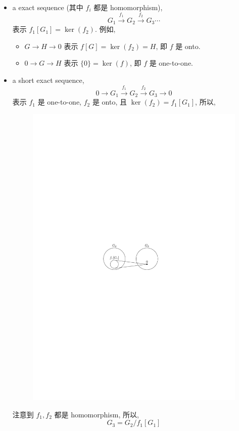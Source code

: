 \begin{itemize}
	\item a exact sequence (其中 $f_i$ 都是 homomorphism),
	\begin{equation}
		G_1 \overset{f_1}{\rightarrow} G_2 \overset{f_2}{\rightarrow} G_3 \cdots
	\end{equation}
	表示 $f_1[G_1] = \ker(f_2)$. 例如,
	\begin{itemize}
		\item $G \rightarrow H \rightarrow 0$ 表示 $f[G] = \ker(f_2) = H$, 即 $f$ 是 onto.
		
		\item $0 \rightarrow G \rightarrow H$ 表示 $\{0\} = \ker(f)$, 即 $f$ 是 one-to-one.
	\end{itemize}
	
	\item a short exact sequence,
	\begin{equation}
		0 \rightarrow G_1 \overset{f_1}{\rightarrow} G_2 \overset{f_2}{\rightarrow} G_3 \rightarrow 0
	\end{equation}
	表示 $f_1$ 是 one-to-one, $f_2$ 是 onto, 且 $\ker(f_2) = f_1[G_1]$, 所以,
	\begin{figure}[H]
		\centering
		\includegraphics[scale=1]{figures/short exact sequence.pdf}
	\end{figure}
	
	注意到 $f_1, f_2$ 都是 homomorphism, 所以,
	\begin{equation}
		G_3 = G_2 / f_1[G_1]
	\end{equation}
\end{itemize}

